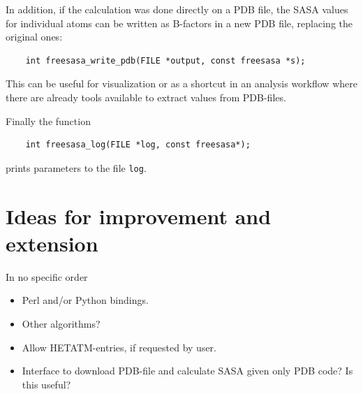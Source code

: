 \documentclass[a4paper,11pt]{article}
\begin{document}
In addition, if the calculation was done directly on a PDB file, the
SASA values for individual atoms can be written as B-factors in a new
PDB file, replacing the original ones:
\begin{verbatim}
    int freesasa_write_pdb(FILE *output, const freesasa *s);
\end{verbatim}
This can be useful for visualization or as a shortcut in an analysis
workflow where there are already tools available to extract values
from PDB-files.

Finally the function
\begin{verbatim}
    int freesasa_log(FILE *log, const freesasa*);
\end{verbatim}
prints parameters to the file \verb|log|.

\section{Ideas for improvement and extension}

In no specific order
\begin{itemize}
\item Perl and/or Python bindings.
\item Other algorithms?
\item Allow HETATM-entries, if requested by user.
\item Interface to download PDB-file and calculate SASA given only PDB
  code? Is this useful?
\end{itemize}


\appendix
\end{document}

